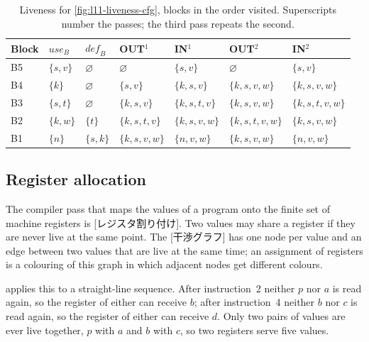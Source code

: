 \documentclass[../main.tex]{subfiles}
\begin{document}
\begin{table}[tb]
  \centering\small
  \setlength{\tabcolsep}{4pt}
  \begin{tabular}{@{}lllllll@{}}
    \toprule
    Block & $\mathit{use}_B$ & $\mathit{def}_B$ & OUT$^1$ & IN$^1$ & OUT$^2$ & IN$^2$ \\
    \midrule
    B5 & $\{s,v\}$ & $\varnothing$ & $\varnothing$ & $\{s,v\}$ & $\varnothing$ & $\{s,v\}$ \\
    B4 & $\{k\}$ & $\varnothing$ & $\{s,v\}$ & $\{k,s,v\}$ & $\{k,s,v,w\}$ & $\{k,s,v,w\}$ \\
    B3 & $\{s,t\}$ & $\varnothing$ & $\{k,s,v\}$ & $\{k,s,t,v\}$ & $\{k,s,v,w\}$ & $\{k,s,t,v,w\}$ \\
    B2 & $\{k,w\}$ & $\{t\}$ & $\{k,s,t,v\}$ & $\{k,s,v,w\}$ & $\{k,s,t,v,w\}$ & $\{k,s,v,w\}$ \\
    B1 & $\{n\}$ & $\{s,k\}$ & $\{k,s,v,w\}$ & $\{n,v,w\}$ & $\{k,s,v,w\}$ & $\{n,v,w\}$ \\
    \bottomrule
  \end{tabular}
  \caption{Liveness for \cref{fig:l11-liveness-cfg}, blocks in the
    order visited.  Superscripts number the passes; the third pass
    repeats the second.}
  \label{tab:l11-liveness}
\end{table}

\subsection{Register allocation}
\label{sec:l11-regalloc}

\begin{definition}
  \label{def:l11-regalloc}
  The compiler pass that maps the values of a program onto the finite
  set of machine registers is [レジスタ割り付け].
  Two values may share a register if they are never live at the same
  point.  The [干渉グラフ] has one node per
  value and an edge between two values that are live at the same time;
  an assignment of registers is a colouring of this graph in which
  adjacent nodes get different colours.
\end{definition}

%
 applies this to a straight-line sequence.
After instruction~2 neither $p$ nor $a$ is read again, so the register
of either can receive $b$; after instruction~4 neither $b$ nor $c$ is
read again, so the register of either can receive $d$.  Only two pairs
of values are ever live together, $p$ with $a$ and $b$ with $c$, so
two registers serve five values.
\end{document}
